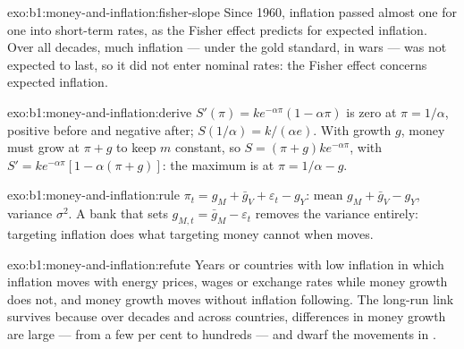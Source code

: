 \begin{solution}{exo:b1:money-and-inflation:fisher-slope}
Since 1960, inflation passed almost one for one into short-term rates, as
the Fisher effect predicts for expected inflation. Over all decades, much
inflation --- under the gold standard, in wars --- was not expected to last,
so it did not enter nominal rates: the Fisher effect concerns expected
inflation.
\end{solution}

\begin{solution}{exo:b1:money-and-inflation:derive}
$S'(\pi) = ke^{-\alpha\pi}(1 - \alpha\pi)$ is zero at $\pi = 1/\alpha$, positive before and negative after;
$S(1/\alpha) = k/(\alpha e)$. With growth $g$, money must grow at $\pi + g$ to keep $m$ constant,
so $S = (\pi + g)ke^{-\alpha\pi}$, with $S' = ke^{-\alpha\pi}[1 - \alpha(\pi + g)]$: the maximum is at $\pi = 1/\alpha - g$.
\end{solution}

\begin{solution}{exo:b1:money-and-inflation:rule}
$\pi_t = g_M + \bar g_V + \varepsilon_t - g_Y$: mean $g_M + \bar g_V - g_Y$, variance $\sigma^2$. A bank that sets
$g_{M,t} = \bar g_M - \varepsilon_t$ removes the variance entirely: targeting inflation does what
targeting money cannot when  moves.
\end{solution}

\begin{solution}{exo:b1:money-and-inflation:refute}
Years or countries with low inflation in which inflation moves with
energy prices, wages or exchange rates while money growth does not, and
money growth moves without inflation following. The long-run link survives
because over decades and across countries, differences in money growth
are large --- from a few per cent to hundreds --- and dwarf the movements in
.
\end{solution}

